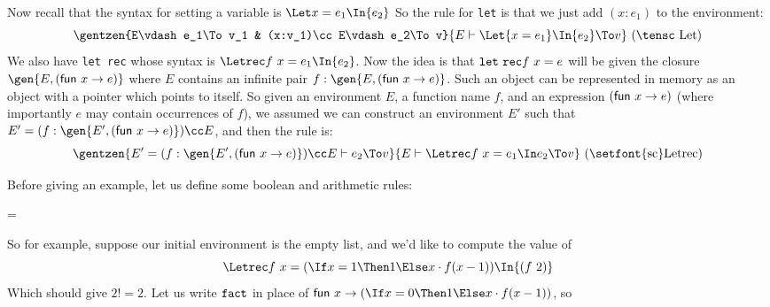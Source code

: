 Now recall that the syntax for setting a variable is $\Let x=e_1\In{e_2}$
So the rule for {\tt let} is that we just add $(x:e_1)$ to the environment:
$$ \gentzen{E\vdash e_1\To v_1 & (x:v_1)\cc E\vdash e_2\To v}{E\vdash\Let{x=e_1}\In{e_2}\To v}\ (\hbox{\tensc Let}) $$
We also have {\tt let rec} whose syntax is $\Letrec f\ x=e_1\In{e_2}$.
Now the idea is that ${\tt let\ rec}f\ x=e$ will be given the closure $\gen{E,(\fun x\to e)}$ where $E$ contains an infinite pair $f:\gen{E,(\fun x\to e)}$.
Such an object can be represented in memory as an object with a pointer which points to itself.
So given an environment $E$, a function name $f$, and an expression $(\fun x\to e)$ (where importantly $e$ may contain occurrences of $f$), we assumed we can construct an environment $E'$ such that
$E'=(f:\gen{E',(\fun x\to e)})\cc E$, and then the rule is:
$$ \gentzen{E'=(f:\gen{E',(\fun x\to e)})\cc E \vdash e_2\To v}{E\vdash\Letrec f\ x=e_1\In e_2\To v}\ (\hbox{\setfont{sc}Letrec}) $$

Before giving an example, let us define some boolean and arithmetic rules:

\centerline{\vbox{\everycr={\noalign{\kern3pt}}
}}

So for example, suppose our initial environment is the empty list, and we'd like to compute the value of
$$ \Letrec f\ x = (\If x=1\Then 1\Else x\cdot f(x-1))\In{(f\ 2)} $$
Which should give $2!=2$.
Let us write ${\tt fact}$ in place of $\fun x\to(\If x=0\Then 1\Else x\cdot f(x-1))$, so
\vfill\break

